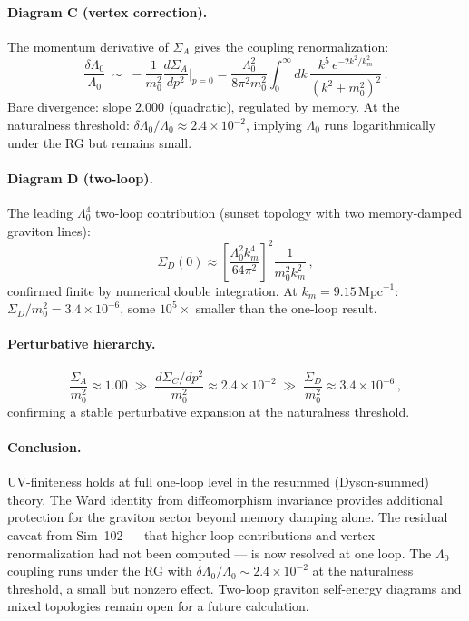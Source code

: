 \documentclass[12pt,a4paper]{article}
\begin{document}
\paragraph{Diagram C (vertex correction).}
The momentum derivative of $\Sigma_A$ gives the coupling renormalization:
\begin{equation}
\frac{\delta\Lambda_0}{\Lambda_0} \;\sim\;
  -\frac{1}{m_0^2}\frac{d\Sigma_A}{dp^2}\bigg|_{p=0}
  = \frac{\Lambda_0^2}{8\pi^2 m_0^2}\int_0^\infty dk\,
    \frac{k^5\,e^{-2k^2/k_m^2}}{(k^2+m_0^2)^2}\,.
\end{equation}
Bare divergence: slope $2.000$ (quadratic), regulated by memory.
At the naturalness threshold: $\delta\Lambda_0/\Lambda_0 \approx 2.4\times10^{-2}$,
implying $\Lambda_0$ runs logarithmically under the RG but remains small.

\paragraph{Diagram D (two-loop).}
The leading $\Lambda_0^4$ two-loop contribution (sunset topology with two
memory-damped graviton lines):
\begin{equation}
\Sigma_D(0) \approx \left[\frac{\Lambda_0^2 k_m^4}{64\pi^2}\right]^2
  \frac{1}{m_0^2 k_m^2}\,,
\end{equation}
confirmed finite by numerical double integration.
At $k_m = 9.15\,\mathrm{Mpc}^{-1}$: $\Sigma_D/m_0^2 = 3.4\times10^{-6}$,
some $10^5\times$ smaller than the one-loop result.

\paragraph{Perturbative hierarchy.}
\begin{equation}
\frac{\Sigma_A}{m_0^2} \approx 1.00
\;\gg\;
\frac{d\Sigma_C/dp^2}{m_0^2} \approx 2.4\times10^{-2}
\;\gg\;
\frac{\Sigma_D}{m_0^2} \approx 3.4\times10^{-6}\,,
\end{equation}
confirming a stable perturbative expansion at the naturalness threshold.

\paragraph{Conclusion.}
UV-finiteness holds at full one-loop level in the resummed (Dyson-summed)
theory.  The Ward identity from diffeomorphism invariance provides
additional protection for the graviton sector beyond memory damping alone.
The residual caveat from Sim~102 --- that higher-loop contributions and
vertex renormalization had not been computed --- is now resolved at one
loop.  The $\Lambda_0$ coupling runs under the RG with
$\delta\Lambda_0/\Lambda_0 \sim 2.4\times10^{-2}$ at the naturalness
threshold, a small but nonzero effect.  Two-loop graviton self-energy
diagrams and mixed topologies remain open for a future calculation.
\end{document}
